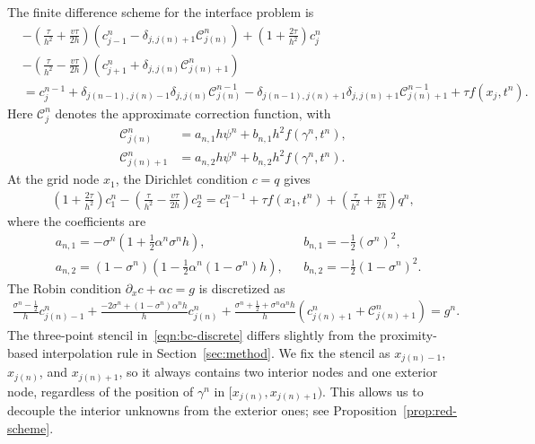\documentclass[11pt,reqno]{amsart}
\theoremstyle{plain}
\theoremstyle{definition}
\numberwithin{equation}{section}
\newcommand{\paren}[1]{\left(#1\right)}
\newcommand{\p}{\partial}
\newcommand{\Corr}{\mathcal C}
\begin{document}
The finite difference scheme for the interface problem is
\begin{equation}\label{eqn:main_discrete}
\begin{aligned}
&-\paren{\frac{\tau}{h^2}+\frac{v\tau}{2h}}\paren{ c_{j-1}^n - \delta_{j,j(n)+1}\Corr_{j(n)}^n } + \paren{1+\frac{2 \tau}{h^2}}c_j^n \\
& - \paren{\frac{\tau}{h^2}-\frac{v\tau}{2h}}\paren{ c_{j+1}^n + \delta_{j,j(n)}\Corr_{j(n)+1}^n } \\
&= c_j^{n-1} + \delta_{j(n-1), j(n)-1}  \delta_{j,j(n)}\Corr_{j(n)}^{n-1}  - \delta_{j(n-1),j(n)+1}\delta_{j,j(n)+1}\Corr_{j(n)+1}^{n-1} + \tau f(x_j, t^n) .
\end{aligned}
\end{equation}
Here $\Corr_j^n$ denotes the approximate correction function, with
\begin{align}
    \Corr_{j(n)}^n &=  a_{n,1} h \psi^n + b_{n,1}h^2 f(\gamma^n,t^n), \\
    \Corr_{j(n)+1}^n &= a_{n,2} h \psi^n  + b_{n,2}h^2 f(\gamma^n,t^n).
\end{align}
At the grid node $x_1$, the Dirichlet condition $c=q$ gives
\begin{equation}
\begin{aligned}
\paren{1+\frac{2 \tau}{h^2}}c_1^n  - \paren{\frac{\tau}{h^2}-\frac{v\tau}{2h}} c_2^n = c_1^{n-1} +  \tau f(x_1,t^n) + \paren{\frac{\tau}{h^2}+\frac{v\tau}{2h}} q^n,
\end{aligned}
\end{equation}
where the coefficients are
\begin{align}
    &a_{n,1} = -\sigma^n\paren{1+\frac{1}{2}\alpha^n\sigma^n h},
    &&b_{n,1} = -\frac{1}{2}\paren{\sigma^n}^2,\\
    &a_{n,2} = \paren{1-\sigma^n}\paren{ 1-\frac{1}{2}\alpha^n\paren{1-\sigma^n}h},
    &&b_{n,2} = -\frac{1}{2}\paren{1-\sigma^n}^2.
\end{align}
The Robin condition $\p_x c+\alpha c=g$ is discretized as
\begin{equation}\label{eqn:bc-discrete}
\begin{aligned}
\frac{ \sigma^n-\frac{1}{2} }{ h} c_{j(n)-1}^n + \frac{ -2\sigma^n+\paren{1-\sigma^n}\alpha^nh}{h} c_{j(n)}^n  + \frac{\sigma^n+\frac{1}{2}+\sigma^n\alpha^nh} {h}\paren{c_{j(n)+1}^n + \Corr_{j(n)+1}^n} = g^n.
\end{aligned}
\end{equation}
The three-point stencil in~\eqref{eqn:bc-discrete} differs slightly from the proximity-based interpolation rule in Section~\ref{sec:method}. We fix the stencil as $x_{j(n)-1}$, $x_{j(n)}$, and $x_{j(n)+1}$, so it always contains two interior nodes and one exterior node, regardless of the position of $\gamma^n$ in $[x_{j(n)},x_{j(n)+1})$. This allows us to decouple the interior unknowns from the exterior ones; see Proposition~\ref{prop:red-scheme}.
\end{document}
